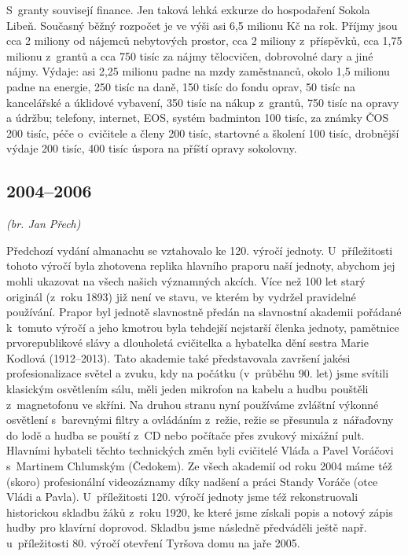 \documentclass[a5paper, 11pt, twoside]{article}
\begin{document}
S~granty souvisejí finance. Jen taková lehká exkurze do hospodaření
Sokola Libeň. Současný běžný rozpočet je ve výši asi 6,5 milionu Kč na
rok. Příjmy jsou cca 2 miliony od nájemců nebytových prostor, cca 2
miliony z~příspěvků, cca 1,75 milionu z~grantů a cca 750 tisíc za nájmy
tělocvičen, dobrovolné dary a jiné nájmy. Výdaje: asi 2,25 milionu padne
na mzdy zaměstnanců, okolo 1,5 milionu padne na energie, 250 tisíc na
daně, 150 tisíc do fondu oprav, 50 tisíc na kancelářské a úklidové
vybavení, 350 tisíc na nákup z~grantů, 750 tisíc na opravy a údržbu;
telefony, internet, EOS, systém badminton 100 tisíc, za známky ČOS 200
tisíc, péče o~cvičitele a členy 200 tisíc, startovné a školení 100
tisíc, drobnější výdaje 200 tisíc, 400 tisíc úspora na příští opravy
sokolovny.

\subsection{2004--2006}

\textit{(br. Jan Přech)}

Předchozí vydání almanachu se vztahovalo ke 120. výročí jednoty. U~příležitosti tohoto výročí byla zhotovena replika hlavního praporu naší
jednoty, abychom jej mohli ukazovat na všech našich významných akcích.
Více než 100 let starý originál (z~roku 1893) již není ve stavu, ve
kterém by vydržel pravidelné používání. Prapor byl jednotě slavnostně
předán na slavnostní akademii pořádané k~tomuto výročí a jeho kmotrou
byla tehdejší nejstarší členka jednoty, pamětnice prvorepublikové slávy
a dlouholetá cvičitelka a hybatelka dění sestra Marie Kodlová
(1912--2013). Tato akademie také představovala završení jakési
profesionalizace světel a zvuku, kdy na počátku (v~průběhu 90. let) jsme
svítili klasickým osvětlením sálu, měli jeden mikrofon na kabelu a hudbu
pouštěli z~magnetofonu ve skříni. Na druhou stranu nyní používáme
zvláštní výkonné osvětlení s~barevnými filtry a ovládáním z~režie, režie
se přesunula z~nářaďovny do lodě a hudba se pouští z~CD nebo počítače
přes zvukový mixážní pult. Hlavními hybateli těchto technických změn
byli cvičitelé Vláďa a Pavel Voráčovi s~Martinem Chlumským (Čedokem). Ze
všech akademií od roku 2004 máme též (skoro) profesionální videozáznamy
díky nadšení a práci Standy Voráče (otce Vládi a Pavla). U~příležitosti
120. výročí jednoty jsme též rekonstruovali historickou skladbu žáků
z~roku 1920, ke které jsme získali popis a notový zápis hudby pro klavírní
doprovod. Skladbu jsme následně předváděli ještě např. u~příležitosti
80. výročí otevření Tyršova domu na jaře 2005.
\end{document}
